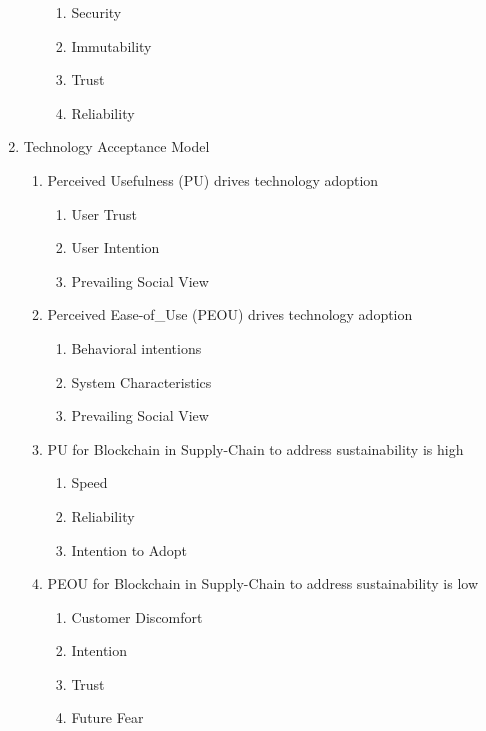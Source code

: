 \documentclass[man]{apa7}
\begin{document}
\begin{enumerate}
\begin{enumerate}
\begin{enumerate}
\item Security \parencite{saberiBlockchainTechnologyIts2019,wangUnderstandingBlockchainTechnology2019}
\item Immutability \parencite{saberiBlockchainTechnologyIts2019,wangUnderstandingBlockchainTechnology2019}
\item Trust \parencite{saberiBlockchainTechnologyIts2019,wangUnderstandingBlockchainTechnology2019}
\item Reliability \parencite{saberiBlockchainTechnologyIts2019,wangUnderstandingBlockchainTechnology2019}
\end{enumerate}
\end{enumerate}
\item Technology Acceptance Model
\begin{enumerate}
\item Perceived Usefulness (PU) drives technology adoption
\begin{enumerate}
\item User Trust \parencite{gefenTrustTAMOnline2003}
\item User Intention \parencite{parkUserAcceptanceDigital2009}
\item Prevailing Social View \parencite{vuPredictorsCloudComputing2020}
\end{enumerate}
\item Perceived Ease-of\_Use (PEOU) drives technology adoption
\begin{enumerate}
\item Behavioral intentions \parencite{parkUserAcceptanceDigital2009}
\item System Characteristics \parencite{parkUserAcceptanceDigital2009}
\item Prevailing Social View \parencite{alduaijEmployingTechnologyAcceptan2020}
\end{enumerate}
\item PU for Blockchain in Supply-Chain to address sustainability is high
\begin{enumerate}
\item Speed \parencite{korpelaDigitalSupplyChain2017}
\item Reliability \parencite{kambleUnderstandingBlockchainTechnology2019}
\item Intention to Adopt \parencite{louIntegratingInnovationDiffusion2017}
\end{enumerate}
\item PEOU for Blockchain in Supply-Chain to address sustainability is low
\begin{enumerate}
\item Customer Discomfort \parencite{kambleUnderstandingBlockchainTechnology2019}
\item Intention \parencite{albayatiAcceptingFinancialTransactions2020}
\item Trust \parencite{albayatiAcceptingFinancialTransactions2020}
\item Future Fear \parencite{yangMaritimeShippingDigitalization2019}
\end{enumerate}
\end{enumerate}
\end{enumerate}










\printbibliography
\end{document}
